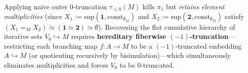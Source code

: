 \begin{proposition}
\begin{enumerate}[label=\textup{(\roman*)},leftmargin=1.8em]
\[  \]
  Applying naive outer $0$-truncation $\tau_{\le 0}(M)$ kills $\pi_1$ but \emph{retains element multiplicities} (since $X_1 := \mathrm{sup}(\mathbf{1}, \mathrm{const}_{\emptyset_M})$ and $X_2 := \mathrm{sup}(\mathbf{2}, \mathrm{const}_{\emptyset_M})$ satisfy $(X_1 =_M X_2) \simeq (\mathbf{1} \simeq \mathbf{2}) \simeq \emptyset$). Recovering the flat cumulative hierarchy of iterative sets $V_0 \hookrightarrow M$ requires \textbf{hereditary fiberwise $(-1)$-truncation}---restricting each branching map $f : A \to M$ to be a $(-1)$-truncated embedding $A \hookrightarrow M$ (or quotienting recursively by bisimulation)---which simultaneously eliminates multiplicities and forces $V_0$ to be $0$-truncated.
\end{enumerate}
\end{proposition}

